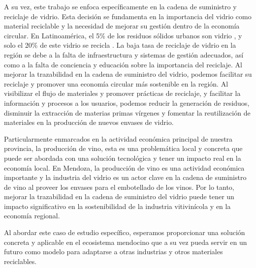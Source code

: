 \documentclass[main.tex]{subfiles}
\begin{document}
A su vez, este trabajo se enfoca específicamente en la cadena de suministro y reciclaje de vidrio. Esta decisión se fundamenta en la importancia del vidrio como material reciclable y la necesidad de mejorar su gestión dentro de la economía circular. En Latinoamérica, el 5\% de los residuos sólidos urbanos son vidrio \cite{cepal2021economia}, y solo el 20\% de este vidrio se recicla \cite{verallia2022whitebook}. La baja tasa de reciclaje de vidrio en la región se debe a la falta de infraestructura y sistemas de gestión adecuados, así como a la falta de conciencia y educación sobre la importancia del reciclaje. Al mejorar la trazabilidad en la cadena de suministro del vidrio, podemos facilitar su reciclaje y promover una economía circular más sostenible en la región. Al visibilizar el flujo de materiales y promover prácticas de reciclaje, y facilitar la información y procesos a los usuarios, podemos reducir la generación de residuos, disminuir la extracción de materias primas vírgenes y fomentar la reutilización de materiales en la producción de nuevos envases de vidrio.

Particularmente enmarcados en la actividad económica principal de nuestra provincia, la producción de vino, esta es una problemática local y concreta que puede ser abordada con una solución tecnológica y tener un impacto real en la economía local. En Mendoza, la producción de vino es una actividad económica importante y la industria del vidrio es un actor clave en la cadena de suministro de vino al proveer los envases para el embotellado de los vinos. Por lo tanto, mejorar la trazabilidad en la cadena de suministro del vidrio puede tener un impacto significativo en la sostenibilidad de la industria vitivinícola y en la economía regional. 

Al abordar este caso de estudio específico, esperamos proporcionar una solución concreta y aplicable en el ecosistema mendocino que a su vez pueda servir en un futuro como modelo para adaptarse a otras industrias y otros materiales reciclables.
\end{document}
